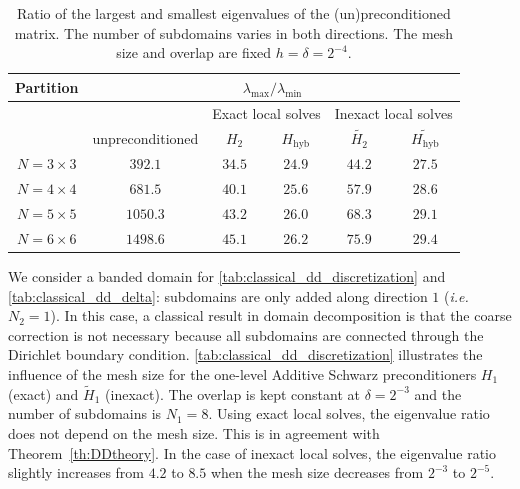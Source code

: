 \documentclass[onefignum,onetabnum]{siamart251216}
\newcommand{\Hhyb}{H_{\text{hyb}}}
\newcommand{\Htwo}{H_2}
\newcommand{\Hhybap}{\widetilde{\Hhyb}}
\newcommand{\Htwoap}{\widetilde{\Htwo}}
\begin{document}
 
\begin{table}[htbp]
\caption{Ratio of the largest and smallest eigenvalues of the (un)preconditioned matrix. The number of subdomains varies in both directions. The mesh size and overlap are fixed $h=\delta=2^{-4}$.}
\label{tab:classical_dd_partition}
\begin{center}
\begin{tabular}{| c |c | c | c | c | c |}
 \hline
 Partition & \multicolumn{5}{|c|}{${\lambda_{\max}}/{\lambda_{\min}}$} \\[0.5ex] \hline
 & & \multicolumn{2}{|c|}{Exact local solves} & \multicolumn{2}{|c|}{Inexact local solves} \\[0.5ex] \hline
 & unpreconditioned & $\Htwo$ & $\Hhyb$& $\Htwoap$  & $\Hhybap$  \\ [0.5ex]
 \hline
 $N = 3\times3$ & $392.1$ & $34.5$ & $24.9$ &  $44.2$ &$27.5$  \\
 \hline
$N = 4\times 4$ & $681.5$ & $40.1$ &$25.6$ & $57.9$ &  $28.6$ \\
 \hline
$N = 5\times 5$ & $1050.3$ & $43.2$& $26.0$ & $68.3$  & $29.1$ \\
 \hline
$N = 6\times 6$ & $1498.6$ & $45.1$& $26.2$ & $75.9$  & $29.4$ \\
 \hline
\end{tabular}
\end{center}
\end{table}

We consider a banded domain for \cref{tab:classical_dd_discretization} and \cref{tab:classical_dd_delta}: subdomains are only added along direction $1$ (\textit{i.e.} $N_2=1$). In this case, a classical result in domain decomposition is that the coarse correction is not necessary because all subdomains are connected through the Dirichlet boundary condition. \cref{tab:classical_dd_discretization} illustrates the influence of the mesh size for the one-level Additive Schwarz preconditioners $H_1$ (exact) and $\tilde H_1$ (inexact). The overlap is kept constant at $\delta = 2^{-3}$ and the number of subdomains is $N_1=8$. Using exact local solves, the eigenvalue ratio does not depend on the mesh size. This is in agreement with Theorem~\ref{th:DDtheory}. In the case of inexact local solves, the eigenvalue ratio slightly increases from $4.2$ to $8.5$ when the mesh size decreases from $2^{-3}$ to $2^{-5}$.
\end{document}
